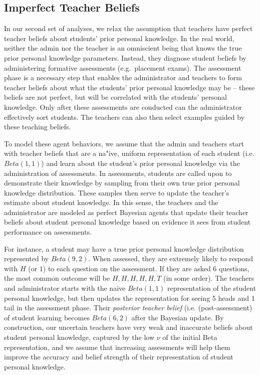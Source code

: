 \documentclass[10pt, letterpaper]{apa6}
\begin{document}
\subsection{Imperfect Teacher Beliefs}\label{imperfect-teacher-beliefs}

In our second set of analyses, we relax the assumption that teachers
have perfect teacher beliefs about students' prior personal knowledge.
In the real world, neither the admin nor the teacher is an omniscient
being that knows the true prior personal knowledge parameters. Instead,
they diagnose student beliefs by administering formative assessments
(e.g.~placement exams). The assessment phase is a necessary step that
enables the administrator and teachers to form teacher beliefs about
what the students' prior personal knowledge may be -- these beliefs are
not perfect, but will be correlated with the students' personal
knowledge. Only after these assessments are conducted can the
administrator effectively sort students. The teachers can also then
select examples guided by these teaching beliefs.

To model these agent behaviors, we assume that the admin and teachers
start with teacher beliefs that are a na"ive, uniform representation of
each student (i.e. \(Beta(1,1)\)) and learn about the student's prior
personal knowledge via the administration of assessments. In
assessments, students are called upon to demonstrate their knowledge by
sampling from their own true prior personal knowledge distribution.
These samples then serve to update the teacher's estimate about student
knowledge. In this sense, the teachers and the administrator are modeled
as perfect Bayesian agents that update their teacher beliefs about
student personal knowledge based on evidence it sees from student
performance on assessments.

For instance, a student may have a true prior personal knowledge
distribution represented by \(Beta(9,2)\). When assessed, they are
extremely likely to respond with \(H\) (or \(1\)) to each question on
the assessment. If they are asked 6 questions, the most common outcome
will be \({H, H, H, H, H, T}\) (in some order). The teachers and
administrator starts with the naive \(Beta(1,1)\) representation of the
student personal knowledge, but then updates the representation for
seeing 5 heads and 1 tail in the assessment phase. Their \emph{posterior
teacher belief} (i.e. (post-assessment) of student learning becomes
\(Beta(6,2)\) after the Bayesian update. By construction, our uncertain
teachers have very weak and inaccurate beliefs about student personal
knowledge, captured by the low \(\nu\) of the initial Beta
representation, and we assume that increasing assessments will help them
improve the accuracy and belief strength of their representation of
student personal knowledge.
\end{document}
